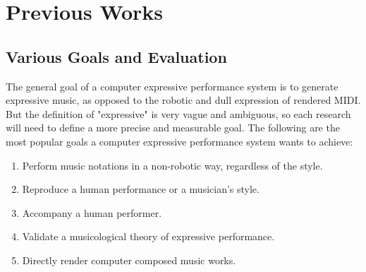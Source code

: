 \chapter{Previous Works}
\label{chap:prev}
\section{Various Goals and Evaluation}
The general goal of a computer expressive performance system is to generate expressive music, as opposed to the robotic and dull expression of rendered MIDI. But the definition of "expressive" is very vague and ambiguous, so each research will need to define a more precise and measurable goal. The following are the most popular goals a computer expressive performance system wants to achieve:
\begin{enumerate}
   \item Perform music notations in a non-robotic way, regardless of the style.
   \item Reproduce a human performance or a musician's style.
   \item Accompany a human performer.
   \item Validate a musicological theory of expressive performance.
   \item Directly render computer composed music works.
\end{enumerate}


